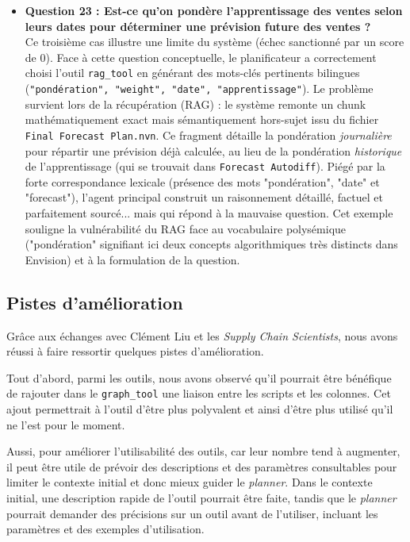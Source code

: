 \begin{itemize}
    \item \textbf{Question 23 : Est-ce qu’on pondère l’apprentissage des ventes selon leurs dates pour déterminer une prévision future des ventes ?}\\
    Ce troisième cas illustre une limite du système (échec sanctionné par un score de 0). Face à cette question conceptuelle, le planificateur a correctement choisi l'outil \texttt{rag\_tool} en générant des mots-clés pertinents bilingues (\texttt{"pondération", "weight", "date", "apprentissage"}). Le problème survient lors de la récupération (RAG) : le système remonte un chunk mathématiquement exact mais sémantiquement hors-sujet issu du fichier \texttt{Final Forecast Plan.nvn}. Ce fragment détaille la pondération \textit{journalière} pour répartir une prévision déjà calculée, au lieu de la pondération \textit{historique} de l'apprentissage (qui se trouvait dans \texttt{Forecast Autodiff}). Piégé par la forte correspondance lexicale (présence des mots "pondération", "date" et "forecast"), l'agent principal construit un raisonnement détaillé, factuel et parfaitement sourcé... mais qui répond à la mauvaise question. Cet exemple souligne la vulnérabilité du RAG face au vocabulaire polysémique ("pondération" signifiant ici deux concepts algorithmiques très distincts dans Envision) et à la formulation de la question.
\end{itemize}

\subsection{Pistes d'amélioration}

Grâce aux échanges avec Clément Liu et les \textit{Supply Chain Scientists}, nous avons réussi à faire ressortir quelques pistes d'amélioration.

Tout d'abord, parmi les outils, nous avons observé qu'il pourrait être bénéfique de rajouter dans le \texttt{graph\_tool} une liaison entre les scripts et les colonnes. Cet ajout permettrait à l'outil d'être plus polyvalent et ainsi d'être plus utilisé qu'il ne l'est pour le moment.

Aussi, pour améliorer l'utilisabilité des outils, car leur nombre tend à augmenter, il peut être utile de prévoir des descriptions et des paramètres consultables pour limiter le contexte initial et donc mieux guider le \textit{planner}. Dans le contexte initial, une description rapide de l'outil pourrait être faite, tandis que le \textit{planner} pourrait demander des précisions sur un outil avant de l'utiliser, incluant les paramètres et des exemples d'utilisation.

